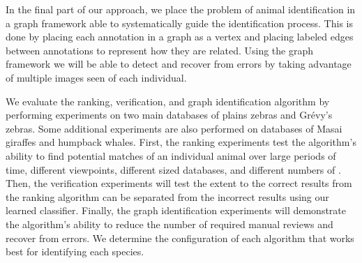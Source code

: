     In the final part of our approach, we place the problem of animal identification in a graph framework able to
    systematically guide the identification process. This is done by placing each annotation in a graph as a vertex and
    placing labeled edges between annotations to represent how they are related. Using the graph framework we will be
    able to detect and recover from errors by taking advantage of multiple images seen of each individual.

    We evaluate the ranking, verification, and graph identification algorithm by performing experiments on two
      main databases of plains zebras and Grévy's zebras.
    Some additional experiments are also performed on databases of Masai giraffes and humpback whales.
    First, the ranking experiments test the algorithm's ability to find potential matches of an individual animal
      over large periods of time, different viewpoints, different sized databases, and different numbers of
      \exemplars{}.
    Then, the verification experiments will test the extent to the correct results from the ranking algorithm can
      be separated from the incorrect results using our learned classifier.
    Finally, the graph identification experiments will demonstrate the algorithm's ability to reduce the number
      of required manual reviews and recover from errors.
    We determine the configuration of each algorithm that works best for identifying each species.
    
    

